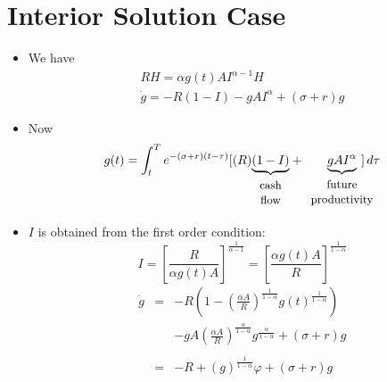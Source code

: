 \documentclass[12pt,compress,handout]{beamer}  %
\begin{document}
\section[Interior]{Interior Solution Case}
\begin{frame}
\begin{center}
\textbf{\insertsection}
\end{center}
\begin{itemize}[<+->]
\item We have
\begin{gather*}
RH=\alpha g(t)AI^{\alpha -1}H \\[2mm]
\dot{g}=-R(1-I)-gAI^{\alpha} +(\sigma +r)g
\end{gather*}

\item Now
\begin{equation*}
g(t)=\int_t^Te^{-(\sigma +r)(t-\tau
)}[(R)\underset{\begin{array}{c}\text{\small cash}\\
\text{\small
flow}\end{array}}{\underbrace{(1-I)}}+\underset{\begin{array}{c}\text{\small
future}\\ \text{\small
productivity}\end{array}}{\underbrace{gAI^{\alpha}}}\hspace{-.2in}]\,d\tau
\end{equation*}
\end{itemize}
\end{frame}


\begin{frame}
\begin{itemize}[<+->]
\item $I$ is obtained from the first order condition:
\begin{equation*}
I = \left[ \frac R{\alpha g(t)A}\right] ^{\frac 1{\alpha -1}} =
\left[ \frac{\alpha g(t)A}R\right] ^{\frac 1{1-\alpha }}
\end{equation*}
\begin{eqnarray*}
\dot{g} &=& -R\left( 1-\left( \frac{\alpha A}R\right) ^{\frac
1{1-\alpha }}g(t)^{\frac 1{1-\alpha }}\right) \\
&&-gA\left( \frac{\alpha A}R\right) ^{\frac \alpha {1-\alpha
}}g^{\frac \alpha {1-\alpha }}+(\sigma +r)g \\
\\
&=& -R+(g)^{\frac 1{1-\alpha }}\varphi +(\sigma +r)g
\end{eqnarray*}
\end{itemize}
\end{frame}
\end{document}
